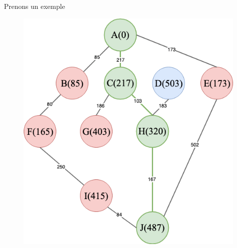 \documentclass[10pt,xcolor=dvipsnames]{beamer}
\begin{document}
\begin{frame}{Prenons un exemple}
{\begin{figure}
        \includegraphics[scale=0.30]{figures/CM3/Djikstra-11.png}
        \label{fig:my_label}
    \end{figure}
    
    }
\end{frame}
\end{document}
